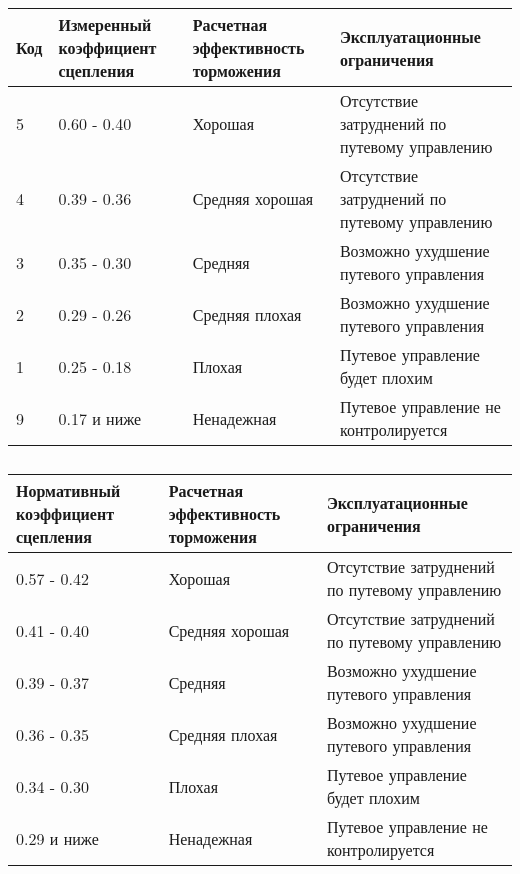 \begin{table}[H]
    \begin{center}
    \caption{} \label{tbl:04T2}
    \small
    \begin{tabular}{|p{}|p{}|p{}|p{}|}
    \hline
    Код	&Измеренный коэффициент сцепления	&Расчетная эффективность торможения	&Эксплуатационные ограничения\\
    \hline
    5	&0.60 - 0.40	                    &Хорошая	                        &Отсутствие затруднений по путевому управлению\\
    4	&0.39 - 0.36	                    &Средняя хорошая	                &Отсутствие затруднений по путевому управлению\\
    3	&0.35 - 0.30	                    &Средняя	                        &Возможно ухудшение путевого управления\\
    2	&0.29 - 0.26	                    &Средняя плохая	                    &Возможно ухудшение путевого управления\\
    1	&0.25 - 0.18	                    &Плохая	                            &Путевое управление будет плохим\\
    9	&0.17 и ниже	                    &Ненадежная	                        &Путевое управление не контролируется\\
    \hline\hline
    \end{tabular}
    \end{center}
\end{table}

\begin{table}[H]
    \begin{center}
    \caption{} \label{tbl:04T3}
    \small
    \begin{tabular}{|p{}|p{}|p{}|}
    \hline
    Нормативный коэффициент сцепления	&Расчетная эффективность торможения	&Эксплуатационные ограничения\\
    \hline    
    0.57 - 0.42	                        &Хорошая	                        &Отсутствие затруднений по путевому управлению\\
    0.41 - 0.40	                        &Средняя хорошая	                &Отсутствие затруднений по путевому управлению\\
    0.39 - 0.37	                        &Средняя	                        &Возможно ухудшение путевого управления\\
    0.36 - 0.35	                        &Средняя плохая	                    &Возможно ухудшение путевого управления\\
    0.34 - 0.30	                        &Плохая	                            &Путевое управление будет плохим\\
    0.29 и ниже	                        &Ненадежная	                        &Путевое управление не контролируется\\        \hline\hline
    \end{tabular}
    \end{center}
\end{table}


